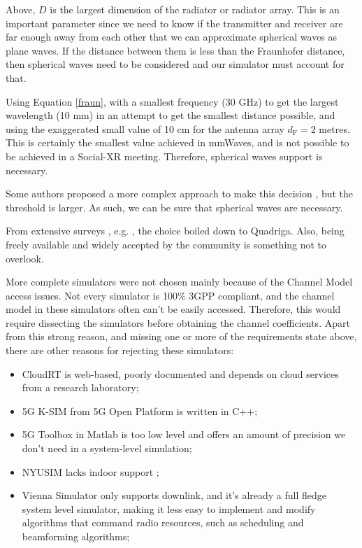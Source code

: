 Above, $D$ is the largest dimension of the radiator or radiator array. This is an important parameter since we need to know if the transmitter and receiver are far enough away from each other that we can approximate spherical waves as plane waves. If the distance between them is less than the Fraunhofer distance, then spherical waves need to be considered and our simulator must account for that.

Using Equation \ref{fraun}, with a smallest frequency (30 GHz) to get the largest wavelength (10 mm) in an attempt to get the smallest distance possible, and using the exaggerated small value of 10 cm for the antenna array $d_{\text{F}} = 2 $ metres. This is certainly the smallest value achieved in mmWaves, and is not possible to be achieved in a Social-XR meeting. Therefore, spherical waves support is necessary.

Some authors proposed a more complex approach to make this decision \cite{4799060}, but the threshold is larger. As such, we can be sure that spherical waves are necessary.



From extensive surveys , e.g. \cite{channel_survey}, the choice boiled down to Quadriga. Also, being freely available and widely accepted by the community is something not to overlook.


More complete simulators were not chosen mainly because of the Channel Model access issues. Not every simulator is 100\% 3GPP compliant, and the channel model in these simulators often can't be easily accessed. Therefore, this would require dissecting the simulators before obtaining the channel coefficients. Apart from this strong reason, and missing one or more of the requirements state above, there are other reasons for rejecting these simulators:
\begin{itemize}
    \item CloudRT \cite{cloudRT} is web-based, poorly documented and depends on cloud services from a research laboratory;
    \item 5G K-SIM from 5G Open Platform is written in C++;
    \item 5G Toolbox in Matlab is too low level and offers an amount of precision we don't need in a system-level simulation;
    \item NYUSIM \cite{nyusim} lacks indoor support ;
    \item Vienna Simulator \cite{Vienna5GSLS} only supports downlink, and it's already a full fledge system level simulator, making it less easy to implement and modify algorithms that command radio resources, such as scheduling and beamforming algorithms;
\end{itemize} 

